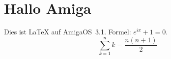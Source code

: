 \documentclass{article}
\begin{document}
\section{Hallo Amiga}
Dies ist \LaTeX{} auf AmigaOS~3.1. Formel: $e^{i\pi}+1=0$.
\[ \sum_{k=1}^{n} k = \frac{n(n+1)}{2} \]
\end{document}
